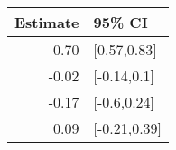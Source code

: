 \begin{tabular}{rl}
  \hline
Estimate & 95\% CI \\ 
  \hline
0.70 & [0.57,0.83] \\ 
  -0.02 & [-0.14,0.1] \\ 
  -0.17 & [-0.6,0.24] \\ 
  0.09 & [-0.21,0.39] \\ 
   \hline
\end{tabular}

